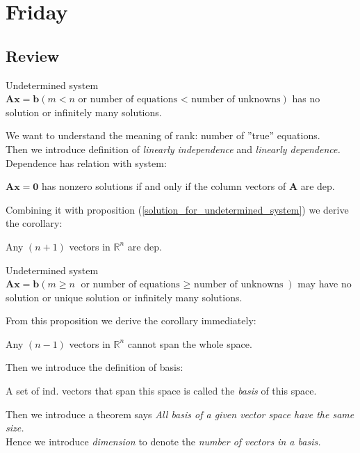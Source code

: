 
\section{Friday}
\subsection{Review}
\begin{proposition}\label{solution_for_undetermined_system}
Undetermined system $\bm{Ax} = \bm b (m<n\text{ or number of equations < number of unknowns})$ has no solution or infinitely many solutions.
\end{proposition}
We want to understand the meaning of rank: number of ''true'' equations. \\Then we introduce definition of \textit{linearly independence} and \textit{linearly dependence.}\\
Dependence has relation with system:
\begin{proposition}
$\bm{Ax} = \bm 0$ has nonzero solutions if and only if the column vectors of $\bm A$ are dep.
\end{proposition}
Combining it with proposition  (\ref{solution_for_undetermined_system}) we derive the corollary:
\begin{corollary}
Any $(n+1)$ vectors in $\mathbb{R}^{n}$ are dep.
\end{corollary}
\begin{proposition}
Undetermined system $\bm{Ax} = \bm b (m\ge n\text{ or number of equations $\ge$ number of unknowns})$ may have no solution or unique solution or infinitely many solutions.
\end{proposition}
From this proposition we derive the corollary immediately:
\begin{corollary}
Any $(n-1)$ vectors in $\mathbb{R}^{n}$ cannot span the whole space.
\end{corollary}
Then we introduce the definition of basis:
\begin{definition}[Basis]
A set of ind. vectors that span this space is called the \emph{basis} of this space.
\end{definition}
Then we introduce a theorem says \emph{All basis of a given vector space have the same size.}\\
Hence we introduce \emph{dimension} to denote the \textit{number of vectors in a basis.}
